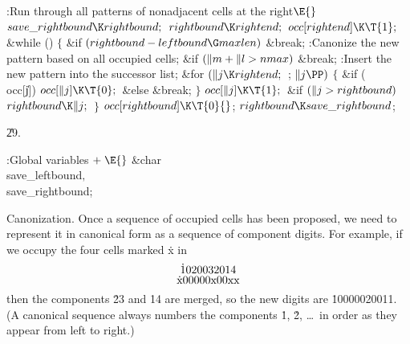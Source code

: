 \B{}:Run through all patterns of nonadjacent cells at
the right\X${}\E{}$\6
$\\{save\_rightbound}\K\\{rightbound};{}$\6
${}\\{rightbound}\K\\{rightend};{}$\6
${}\\{occ}[\\{rightend}]\K\T{1};{}$\6
\&{while} ()\5
${}\{{}$\1\6
\&{if} ${}(\\{rightbound}-\\{leftbound}\G\\{maxlen}){}$\1\5
\&{break};\2\6
:Canonize the new pattern based on all occupied cells\X;\6
\&{if} ${}(\|m+\|l>\\{nmax}){}$\1\5
\&{break};\2\6
:Insert the new pattern into the successor list\X;\6
\&{for} ${}(\|j\K\\{rightend};{}$  ; ${}\|j\PP){}$\5
${}\{{}$\1\6
\&{if} (\\{occ}[\|j])\1\5
${}\\{occ}[\|j]\K\T{0};{}$\2\6
\&{else}\1\5
\&{break};\2\6
\4${}\}{}$\2\6
${}\\{occ}[\|j]\K\T{1};{}$\6
\&{if} ${}(\|j>\\{rightbound}){}$\1\5
${}\\{rightbound}\K\|j;{}$\2\6
\4${}\}{}$\2\6
${}\\{occ}[\\{rightbound}]\K\T{0}{}$;\6
${}\\{rightbound}\K\\{save\_rightbound}{}$;\par
\U29.\fi

\B{}:Global variables\X${}\mathrel+\E{}$\6
\&{char} \\{save\_leftbound}${},{}$ \\{save\_rightbound};\par
\fi

Canonization. Once a sequence of occupied cells has
been proposed, we need
to represent it in canonical form as a sequence of component digits. For
example, if we occupy the four cells marked \.x in
$$\vbox{\halign{\hfil\.{#}\hfil\cr
1020032014\cr
\noalign{\vskip-3pt}
x00000x00xx\cr}}$$
then the components \.{23} and \.{14} are merged, so the new digits are
\.{10000020011}. (A canonical sequence always numbers the components
\.1, \.2, \dots~in order as they appear from left to right.)

